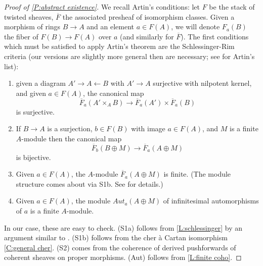 \documentclass[11pt]{amsart}
\newcommand{\widebar}[1]{\overline{#1}}
\renewcommand{\[}{[\!\hspace{0.03em}[}
\renewcommand{\]}{]\!\hspace{0.03em}]}
\renewcommand{\(}{(\!\hspace{0.03em}(}
\renewcommand{\)}{)\!\hspace{0.03em})}
\theoremstyle{definition}
\theoremstyle{remark}
\begin{document}
\begin{proof}[Proof of \ref{P:abstract existence}] We recall Artin's 
conditions: let $F$ be the stack of twisted sheaves, $\widebar F$ the 
associated presheaf of isomorphism classes.  Given a morphism of 
rings $B\to A$ and an element $a\in F(A)$, we will denote $F_{a}(B)$ 
the fiber of $F(B)\to F(A)$ over $a$ (and similarly for $\widebar 
F$).  The first conditions which must be satisfied to apply Artin's 
theorem are the Schlessinger-Rim criteria (our versions are slightly 
more general then are necessary; see \cite{artin} for Artin's list): 
\begin{enumerate}
    \item[(S1a)] given a diagram $A'\to 
A\leftarrow B$ with $A'\to A$ surjective with nilpotent kernel, and 
given $a\in F(A)$, the canonical map $$\widebar 
F_{a}(A'\times_{A}B)\to\widebar F_{a}(A')\times\widebar F_{a}(B)$$
is surjective.  

    \item[(S1b)] If $B\to A$ is a surjection, $b\in F(B)$ with image 
    $a\in F(A)$, and $M$ is a finite $A$-module then the canonical map 
    $$\widebar F_{b}(B\oplus M)\to\widebar F_{a}(A\oplus M)$$
    is bijective.

    \item[(S2)] Given $a\in F(A)$, the $A$-module $\widebar 
    F_{a}(A\oplus M)$ is finite.  (The module structure comes about 
    via S1b.  See \cite{artin, rim, schl} for details.)

    \item[(Aut)] Given $a\in F(A)$, the module $Aut_{a}(A\oplus M)$ of 
    infinitesimal automorphisms of $a$ is a finite $A$-module.
\end{enumerate}
In our case, these are easy to check.  (S1a) follows from 
\ref{L:schlessinger} by an argument similar to \cite[3.1]{schl}.  
(S1b) follows from the cher \`a Cartan 
isomorphism \ref{C:general cher}.  (S2) comes from the coherence of derived pushforwards of 
coherent sheaves on proper morphisms.  (Aut) follows from 
\ref{L:finite coho}.


\end{proof}
\end{document}
